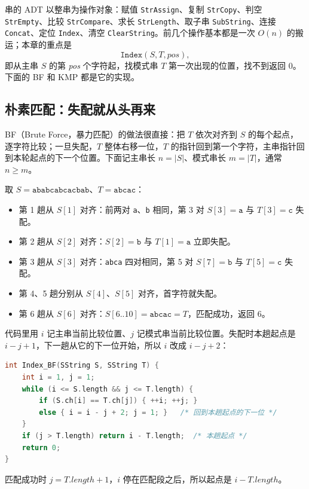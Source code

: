 串的 ADT 以整串为操作对象：赋值 \texttt{StrAssign}、复制 \texttt{StrCopy}、判空 \texttt{StrEmpty}、比较 \texttt{StrCompare}、求长 \texttt{StrLength}、取子串 \texttt{SubString}、连接 \texttt{Concat}、定位 \texttt{Index}、清空 \texttt{ClearString}。前几个操作基本都是一次 $O(n)$ 的搬运；本章的重点是
\[
\texttt{Index}(S,T,\textit{pos}),
\]
即从主串 $S$ 的第 \textit{pos} 个字符起，找模式串 $T$ 第一次出现的位置，找不到返回 0。下面的 BF 和 KMP 都是它的实现。

\subsection{朴素匹配：失配就从头再来}

BF（Brute Force，暴力匹配）的做法很直接：把 $T$ 依次对齐到 $S$ 的每个起点，逐字符比较；一旦失配，$T$ 整体右移一位，$T$ 的指针回到第一个字符，主串指针回到本轮起点的下一个位置。下面记主串长 $n=|S|$、模式串长 $m=|T|$，通常 $n\ge m$。

取 $S=\texttt{ababcabcacbab}$、$T=\texttt{abcac}$：
\begin{itemize}
  \item 第 1 趟从 $S[1]$ 对齐：前两对 \texttt{a}、\texttt{b} 相同，第 3 对 $S[3]=\texttt{a}$ 与 $T[3]=\texttt{c}$ 失配。
  \item 第 2 趟从 $S[2]$ 对齐：$S[2]=\texttt{b}$ 与 $T[1]=\texttt{a}$ 立即失配。
  \item 第 3 趟从 $S[3]$ 对齐：\texttt{abca} 四对相同，第 5 对 $S[7]=\texttt{b}$ 与 $T[5]=\texttt{c}$ 失配。
  \item 第 4、5 趟分别从 $S[4]$、$S[5]$ 对齐，首字符就失配。
  \item 第 6 趟从 $S[6]$ 对齐：$S[6..10]=\texttt{abcac}=T$，匹配成功，返回 6。
\end{itemize}

代码里用 $i$ 记主串当前比较位置、$j$ 记模式串当前比较位置。失配时本趟起点是 $i-j+1$，下一趟从它的下一位开始，所以 $i$ 改成 $i-j+2$：
\begin{lstlisting}[language=C]
int Index_BF(SString S, SString T) {
    int i = 1, j = 1;
    while (i <= S.length && j <= T.length) {
        if (S.ch[i] == T.ch[j]) { ++i; ++j; }
        else { i = i - j + 2; j = 1; }   /* 回到本趟起点的下一位 */
    }
    if (j > T.length) return i - T.length;  /* 本趟起点 */
    return 0;
}
\end{lstlisting}
匹配成功时 $j=T.length+1$，$i$ 停在匹配段之后，所以起点是 $i-T.length$。

